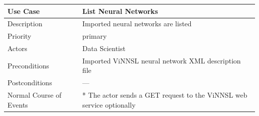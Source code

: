 \begin{longtable}[]{@{}ll@{}}
\toprule
\begin{minipage}[b]{0.27\columnwidth}\raggedright\strut
\textbf{Use Case}\strut
\end{minipage} & \begin{minipage}[b]{0.68\columnwidth}\raggedright\strut
\textbf{List Neural Networks}\strut
\end{minipage}\tabularnewline
\midrule
\endhead
\begin{minipage}[t]{0.27\columnwidth}\raggedright\strut
Description\strut
\end{minipage} & \begin{minipage}[t]{0.68\columnwidth}\raggedright\strut
Imported neural networks are listed\strut
\end{minipage}\tabularnewline
\begin{minipage}[t]{0.27\columnwidth}\raggedright\strut
Priority\strut
\end{minipage} & \begin{minipage}[t]{0.68\columnwidth}\raggedright\strut
primary\strut
\end{minipage}\tabularnewline
\begin{minipage}[t]{0.27\columnwidth}\raggedright\strut
Actors\strut
\end{minipage} & \begin{minipage}[t]{0.68\columnwidth}\raggedright\strut
Data Scientist\strut
\end{minipage}\tabularnewline
\begin{minipage}[t]{0.27\columnwidth}\raggedright\strut
Preconditions\strut
\end{minipage} & \begin{minipage}[t]{0.68\columnwidth}\raggedright\strut
Imported ViNNSL neural network XML description file\strut
\end{minipage}\tabularnewline
\begin{minipage}[t]{0.27\columnwidth}\raggedright\strut
Postconditions\strut
\end{minipage} & \begin{minipage}[t]{0.68\columnwidth}\raggedright\strut
---\strut
\end{minipage}\tabularnewline
\begin{minipage}[t]{0.27\columnwidth}\raggedright\strut
Normal Course of Events\strut
\end{minipage} & \begin{minipage}[t]{0.68\columnwidth}\raggedright\strut
* The actor sends a GET request to the ViNNSL web service optionally

\end{minipage}
\end{longtable}
